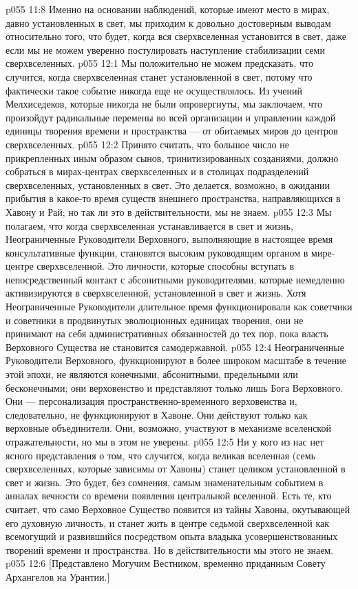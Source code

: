 \vs p055 11:8 Именно на основании наблюдений, которые имеют место в мирах, давно установленных в свет, мы приходим к довольно достоверным выводам относительно того, что будет, когда вся сверхвселенная установится в свет, даже если мы не можем уверенно постулировать наступление стабилизации семи сверхвселенных.
\vs p055 12:1 Мы положительно не можем предсказать, что случится, когда сверхвселенная станет установленной в свет, потому что фактически такое событие никогда еще не осуществлялось. Из учений Мелхиседеков, которые никогда не были опровергнуты, мы заключаем, что произойдут радикальные перемены во всей организации и управлении каждой единицы творения времени и пространства --- от обитаемых миров до центров сверхвселенных.
\vs p055 12:2 Принято считать, что большое число не прикрепленных иным образом сынов, тринитизированных созданиями, должно собраться в мирах\hyp{}центрах сверхвселенных и в столицах подразделений сверхвселенных, установленных в свет. Это делается, возможно, в ожидании прибытия в какое\hyp{}то время существ внешнего пространства, направляющихся в Хавону и Рай; но так ли это в действительности, мы не знаем.
\vs p055 12:3 \pc Мы полагаем, что когда сверхвселенная устанавливается в свет и жизнь, Неограниченные Руководители Верховного, выполняющие в настоящее время консультативные функции, становятся высоким руководящим органом в мире\hyp{}центре сверхвселенной. Это личности, которые способны вступать в непосредственный контакт с абсонитными руководителями, которые немедленно активизируются в сверхвселенной, установленной в свет и жизнь. Хотя Неограниченные Руководители длительное время функционировали как советчики и советники в продвинутых эволюционных единицах творения, они не принимают на себя административных обязанностей до тех пор, пока власть Верховного Существа не становится самодержавной.
\vs p055 12:4 Неограниченные Руководители Верховного, функционируют в более широком масштабе в течение этой эпохи, не являются конечными, абсонитными, предельными или бесконечными; они  верховенство и представляют только лишь Бога Верховного. Они --- персонализация пространственно\hyp{}временного верховенства и, следовательно, не функционируют в Хавоне. Они действуют только как верховные объединители. Они, возможно, участвуют в механизме вселенской отражательности, но мы в этом не уверены.
\vs p055 12:5 \pc Ни у кого из нас нет ясного представления о том, что случится, когда великая вселенная (семь сверхвселенных, которые зависимы от Хавоны) станет целиком установленной в свет и жизнь. Это будет, без сомнения, самым знаменательным событием в анналах вечности со времени появления центральной вселенной. Есть те, кто считает, что само Верховное Существо появится из тайны Хавоны, окутывающей его духовную личность, и станет жить в центре седьмой сверхвселенной как всемогущий и развившийся посредством опыта владыка усовершенствованных творений времени и пространства. Но в действительности мы этого не знаем.
\vsetoff
\vs p055 12:6 [Представлено Могучим Вестником, временно приданным Совету Архангелов на Урантии.]
